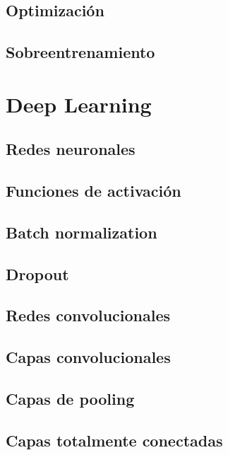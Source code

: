 \subsection{Optimización} \label{optimización}


\subsection*{Sobreentrenamiento}



\section{Deep Learning}

\subsection*{Redes neuronales}

\subsection*{Funciones de activación}




\subsection*{Batch normalization}


\subsection*{Dropout}


\subsection{Redes convolucionales}

\subsection*{Capas convolucionales}

\subsection*{Capas de pooling}


\subsection*{Capas totalmente conectadas}



